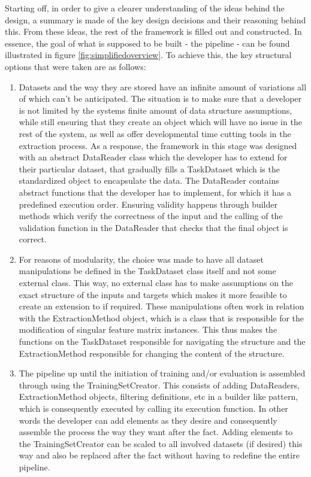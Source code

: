 Starting off, in order to give a clearer understanding of the ideas behind the design, a summary is made of the key design decisions and their reasoning behind this. From these ideas, the rest of the framework is filled out and constructed. In essence, the goal of what is supposed to be built - the pipeline - can be found illustrated in figure \ref{fig:simplifiedoverview}. To achieve this, the key structural options that were taken are as follows:

\begin{enumerate}
	\item Datasets and the way they are stored have an infinite amount of variations all of which can't be anticipated. The situation is to make sure that a developer is not limited by the systems finite amount of data structure assumptions, while still ensuring that they create an object which will have no issue in the rest of the system, as well as offer developmental time cutting tools in the extraction process. As a response, the framework in this stage was designed with an abstract DataReader class which the developer has to extend for their particular dataset, that gradually fills a TaskDataset which is the standardized object to encapsulate the data. The DataReader contains abstract functions that the developer has to implement, for which it has a predefined execution order. Ensuring validity happens through builder methods which verify the correctness of the input and the calling of the validation function in the DataReader that checks that the final object is correct.
	\item For reasons of modularity, the choice was made to have all dataset manipulations be defined in the TaskDataset class itself and not some external class. This way, no external class has to make assumptions on the exact structure of the inputs and targets which makes it more feasible to create an extension to if required. These manipulations often work in relation with the ExtractionMethod object, which is a class that is responsible for the modification of singular feature matrix instances. This thus makes the functions on the TaskDataset responsible for navigating the structure and the ExtractionMethod responsible for changing the content of the structure.
	\item The pipeline up until the initiation of training and/or evaluation is assembled through using the TrainingSetCreator. This consists of adding DataReaders, ExtractionMethod objects, filtering definitions, etc in a builder like pattern, which is consequently executed by calling its execution function. In other words the developer can add elements as they desire and consequently assemble the process the way they want after the fact. Adding elements to the TrainingSetCreator can be scaled to all involved datasets (if desired) this way and also be replaced after the fact without having to redefine the entire pipeline. 

\end{enumerate}
